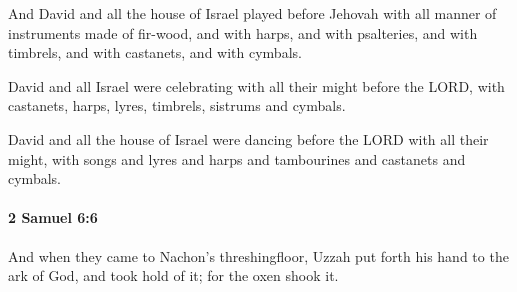			\begin{versebox}
					\item[BHS] 
					\item[ASV] And David and all the house of Israel played before Jehovah with all manner of instruments made of fir-wood, and with harps, and with psalteries, and with timbrels, and with castanets, and with cymbals.
					\item[NIV] David and all Israel were celebrating with all their might before the LORD, with castanets, harps, lyres, timbrels, sistrums and cymbals.
					\item[NRSV] David and all the house of Israel were dancing before the LORD with all their might, with songs and lyres and harps and tambourines and castanets and cymbals.
			\end{versebox}

		\paragraph{2 Samuel 6:6} %
			\label{2SAMUEL-6-6}

			And when they came to Nachon’s threshingfloor, Uzzah put forth his hand to the ark of God, and took hold of it; for the oxen shook it.

